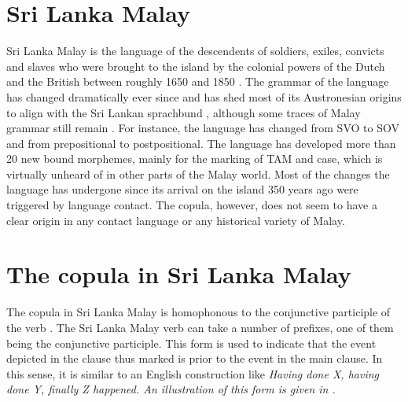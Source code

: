 \documentclass[a4paper,12pt]{article}
\begin{document}
\section{Sri Lanka Malay}\label{sec:introslm}
Sri Lanka Malay is the language of the descendents of soldiers, exiles, convicts and slaves who were brought to the island by the colonial powers of the Dutch and the British between roughly 1650 and 1850 \citep{Hussainmiya1990}. The grammar of the language has changed dramatically ever since \citep{Adelaar1991,SmithEtAl2004,Ansaldo2008genesis,Nordhoff2009phd} and has shed most of its Austronesian origins to align with the Sri Lankan sprachbund \citep{Bakker2006}, although some traces of Malay grammar still remain \citep{Slomanson2006cll}. For instance, the language has changed from SVO to SOV and from prepositional to postpositional. The language has developed more than 20 new bound morphemes, mainly for the marking of TAM and case, which is virtually unheard of in other parts of the Malay world.  Most of the changes the language has undergone since its arrival on the island 350 years ago were triggered by language contact. The copula, however, does not seem to have a clear origin in any contact language or any historical variety of Malay.

\section{The copula in Sri Lanka Malay}\label{sec:slmcopula}
The copula in Sri Lanka Malay is homophonous to the conjunctive participle of the verb .
The Sri Lanka Malay verb can take a number of prefixes, one of them being the conjunctive participle. This form is used to indicate that the event depicted in the clause thus marked is prior to the event in the main clause. In this sense, it is similar to an English construction like \em Having done X, having done Y, finally Z happened\em. An illustration of this form is given in .

\end{document}

